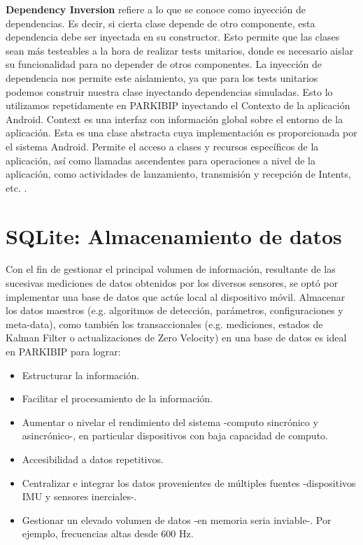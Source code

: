 \textbf{Dependency Inversion} refiere a lo que se conoce como inyección de dependencias. Es decir, si cierta clase depende de otro componente, esta dependencia debe ser inyectada en su constructor. Esto permite que las clases sean más testeables a la hora de realizar tests unitarios, donde es necesario aislar su funcionalidad para no depender de otros componentes. La inyección de dependencia nos permite este aislamiento, ya que para los tests unitarios podemos construir nuestra clase inyectando dependencias simuladas. Esto lo utilizamos repetidamente en PARKIBIP inyectando el Contexto de la aplicación Android. Context es una interfaz con información global sobre el entorno de la aplicación. Esta es una clase abstracta cuya implementación es proporcionada por el sistema Android. Permite el acceso a clases y recursos específicos de la aplicación, así como llamadas ascendentes para operaciones a nivel de la aplicación, como actividades de lanzamiento, transmisión y recepción de Intents, etc. \cite{AndroidContext}.

\section{SQLite: Almacenamiento de datos}

Con el fin de gestionar el principal volumen de información, resultante de las sucesivas mediciones de datos obtenidos por los diversos sensores, se optó por implementar una base de datos que actúe local al dispositivo móvil. Almacenar los datos maestros (e.g. algoritmos de detección, parámetros, configuraciones y meta-data), como también los transaccionales (e.g. mediciones, estados de Kalman Filter o actualizaciones de Zero Velocity) en una base de datos es ideal en PARKIBIP para lograr:

\begin{itemize}
    \item Estructurar la información.
    \item Facilitar el procesamiento de la información.
    \item Aumentar o nivelar el rendimiento del sistema -computo sincrónico y asincrónico-, en particular dispositivos con baja capacidad de computo.
    \item Accesibilidad a datos repetitivos.
    \item Centralizar e integrar los datos provenientes de múltiples fuentes -dispositivos IMU y sensores inerciales-.
    \item Gestionar un elevado volumen de datos -en memoria seria inviable-. Por ejemplo, frecuencias altas desde 600 Hz.
\end{itemize}

